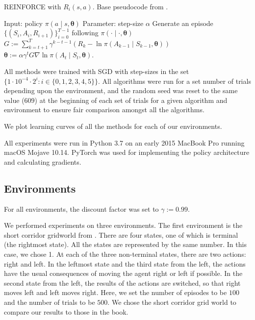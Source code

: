 \documentclass{article}
\begin{document}
  \begin{algorithm}
    \caption{REINFORCE with $R_i(s, a)$. Base pseudocode from \citet[p.328]{sutton2018reinforcement}.}
    \label{alg:information_content}
    \begin{algorithmic}
      \State Input: policy $\pi(a \mid s, \bm{\theta})$
      \State Parameter: step-size $\alpha$
        \State Generate an episode $\{(S_i, A_i, R_{i + 1})\}_{i = 0}^{T - 1}$ following $\pi(\cdot \mid \cdot, \bm{\theta})$
          \State $G := \sum_{k = t + 1}^T \gamma^{k - t - 1} (R_k - \ln \pi(A_{k - 1} \mid S_{k - 1}, \bm{\theta}))$
          \State $\bm{\theta} := \alpha \gamma^t G \nabla \ln \pi(A_t \mid S_t, \bm{\theta})$.
        \EndFor
      \EndFor
    \end{algorithmic}
  \end{algorithm}

  All methods were trained with SGD with step-sizes in the set $\{1 \cdot 10^{-4} \cdot 2^i : i \in \{0, 1, 2, 3, 4, 5\}\}$. All algorithms were run for a set number of trials depending upon the environment, and the random seed was reset to the same value (609) at the beginning of each set of trials for a given algorithm and environment to ensure fair comparison amongst all the algorithms.

  We plot learning curves of all the methods for each of our environments.

  All experiments were run in Python 3.7 on an early 2015 MacBook Pro running macOS Mojave 10.14. PyTorch was used for implementing the policy architecture and calculating gradients.

  \subsection{Environments}
  For all environments, the discount factor was set to $\gamma := 0.99$.

  We performed experiments on three environments. The first environment is the short corridor gridworld from \citet[p.~323]{sutton2018reinforcement}. There are four states, one of which is terminal (the rightmost state). All the states are represented by the same number. In this case, we chose 1. At each of the three non-terminal states, there are two actions: right and left. In the leftmost state and the third state from the left, the actions have the usual consequences of moving the agent right or left if possible. In the second state from the left, the results of the actions are switched, so that right moves left and left moves right. Here, we set the number of episodes to be $100$ and the number of trials to be $500$. We chose the short corridor grid world to compare our results to those in the book.
\end{document}

